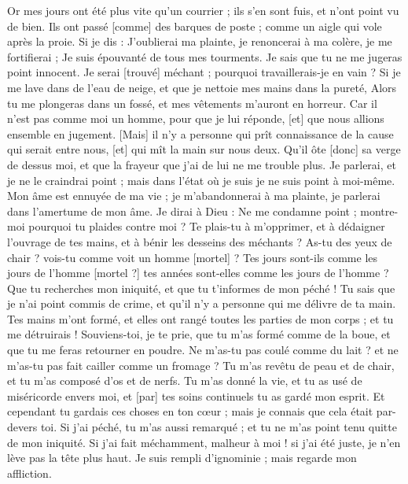 \begin{multicols}{2}
Or mes jours ont été plus vite qu'un courrier ; ils s'en sont fuis, et n'ont point vu de bien.
Ils ont passé [comme] des barques de poste ; comme un aigle qui vole après la proie.
Si je dis : J'oublierai ma plainte, je renoncerai à ma colère, je me fortifierai ;
Je suis épouvanté de tous mes tourments. Je sais que tu ne me jugeras point innocent.
Je serai [trouvé] méchant ; pourquoi travaillerais-je en vain ?
Si je me lave dans de l'eau de neige, et que je nettoie mes mains dans la pureté,
Alors tu me plongeras dans un fossé, et mes vêtements m'auront en horreur.
Car il n'est pas comme moi un homme, pour que je lui réponde, [et] que nous allions ensemble en jugement.
[Mais] il n'y a personne qui prît connaissance de la cause qui serait entre nous, [et] qui mît la main sur nous deux.
Qu'il ôte [donc] sa verge de dessus moi, et que la frayeur que j'ai de lui ne me trouble plus.
Je parlerai, et je ne le craindrai point ; mais dans l'état où je suis je ne suis point à moi-même.
\VerseOne{}Mon âme est ennuyée de ma vie ; je m'abandonnerai à ma plainte, je parlerai dans l'amertume de mon âme.
Je dirai à Dieu : Ne me condamne point ; montre-moi pourquoi tu plaides contre moi ?
Te plais-tu à m'opprimer, et à dédaigner l'ouvrage de tes mains, et à bénir les desseins des méchants ?
As-tu des yeux de chair ? vois-tu comme voit un homme [mortel] ?
Tes jours sont-ils comme les jours de l'homme [mortel ?] tes années sont-elles comme les jours de l'homme ?
Que tu recherches mon iniquité, et que tu t'informes de mon péché !
Tu sais que je n'ai point commis de crime, et qu'il n'y a personne qui me délivre de ta main.
Tes mains m'ont formé, et elles ont rangé toutes les parties de mon corps ; et tu me détruirais !
Souviens-toi, je te prie, que tu m'as formé comme de la boue, et que tu me feras retourner en poudre.
Ne m'as-tu pas coulé comme du lait ? et ne m'as-tu pas fait cailler comme un fromage ?
Tu m'as revêtu de peau et de chair, et tu m'as composé d'os et de nerfs.
Tu m'as donné la vie, et tu as usé de miséricorde envers moi, et [par] tes soins continuels tu as gardé mon esprit.
Et cependant tu gardais ces choses en ton cœur ; mais je connais que cela était par-devers toi.
Si j'ai péché, tu m'as aussi remarqué ; et tu ne m'as point tenu quitte de mon iniquité.
Si j'ai fait méchamment, malheur à moi ! si j'ai été juste, je n'en lève pas la tête plus haut. Je suis rempli d'ignominie ; mais regarde mon affliction.

\end{multicols}
